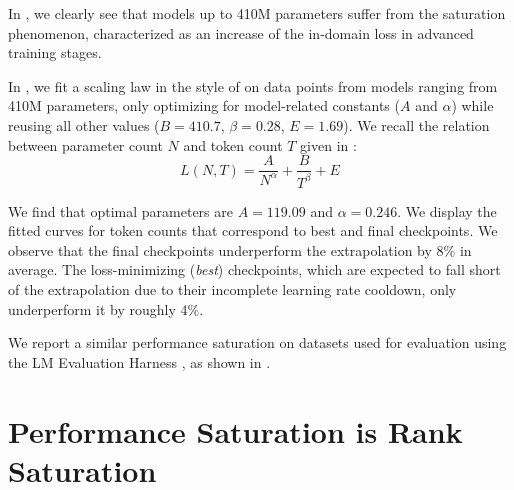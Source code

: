 In , we clearly see that models up to 410M parameters suffer from the saturation phenomenon, characterized as an increase of the in-domain loss in advanced training stages. 

In , we fit a scaling law in the style of \citet{chinchilla_scaling} on data points from models ranging from 410M parameters, only optimizing for model-related constants ($A$ and $\alpha$) while reusing all other values ($B=410.7$, $\beta=0.28$, $E=1.69$). We recall the relation between parameter count $N$ and token count $T$ given in \citet{chinchilla_scaling}:
$$
L(N, T) = \frac{A}{N^\alpha} + \frac{B}{T^\beta} + E
$$

We find that optimal parameters are $A=119.09$ and $\alpha=0.246$. We display the fitted curves for token counts that correspond to best and final checkpoints. We observe that the final checkpoints underperform the extrapolation by 8\% in average. The loss-minimizing (\textit{best}) checkpoints, which are expected to fall short of the extrapolation due to their incomplete learning rate cooldown, only underperform it by roughly 4\%.

We report a similar performance saturation on datasets used for evaluation using the LM Evaluation Harness \citep{eval-harness}, as shown in .

\begin{table}[ht]
\centering
{}
\caption{Zero-shot performance of Pythia-160M best and final checkpoints on evaluation datasets. Unless specified, we report accuracy for all tasks.}
\label{tab:perf_gap}
\end{table}


\section{Performance Saturation is Rank Saturation}
